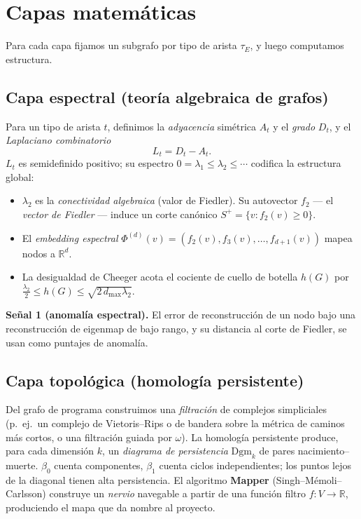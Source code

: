 \documentclass[11pt]{article}
\newcommand{\R}{\mathbb{R}}
\begin{document}
\section{Capas matemáticas}
Para cada capa fijamos un subgrafo por tipo de arista $\tau_E$, y luego
computamos estructura.

\subsection{Capa espectral (teoría algebraica de grafos)}
Para un tipo de arista $t$, definimos la \emph{adyacencia} simétrica $A_t$ y el
\emph{grado} $D_t$, y el \emph{Laplaciano combinatorio}
\[
L_t = D_t - A_t .
\]
$L_t$ es semidefinido positivo; su espectro
$0 = \lambda_1 \le \lambda_2 \le \cdots$ codifica la estructura global:
\begin{itemize}[leftmargin=1.5em]
  \item $\lambda_2$ es la \emph{conectividad algebraica} (valor de Fiedler). Su
        autovector $f_2$ --- el \emph{vector de Fiedler} --- induce un corte
        canónico $S^+ = \{v : f_2(v) \ge 0\}$.
  \item El \emph{embedding espectral}
        $\Phi^{(d)}(v) = (f_2(v), f_3(v), \dots, f_{d+1}(v))$ mapea nodos a
        $\R^d$.
  \item La desigualdad de Cheeger acota el cociente de cuello de botella $h(G)$
        por $\tfrac{\lambda_2}{2} \le h(G) \le \sqrt{2\,d_{\max}\lambda_2}$.
\end{itemize}
\textbf{Señal 1 (anomalía espectral).} El error de reconstrucción de un nodo
bajo una reconstrucción de eigenmap de bajo rango, y su distancia al corte de
Fiedler, se usan como puntajes de anomalía.

\subsection{Capa topológica (homología persistente)}
Del grafo de programa construimos una \emph{filtración} de complejos
simpliciales (p.~ej.\ un complejo de Vietoris--Rips o de bandera sobre la
métrica de caminos más cortos, o una filtración guiada por $\omega$). La
homología persistente produce, para cada dimensión $k$, un \emph{diagrama de
persistencia} $\mathrm{Dgm}_k$ de pares nacimiento--muerte. $\beta_0$ cuenta
componentes, $\beta_1$ cuenta ciclos independientes; los puntos lejos de la
diagonal tienen alta persistencia. El algoritmo \textbf{Mapper}
(Singh--M\'emoli--Carlsson) construye un \emph{nervio} navegable a partir de una
función filtro $f: V \to \R$, produciendo el mapa que da nombre al proyecto.
\end{document}
